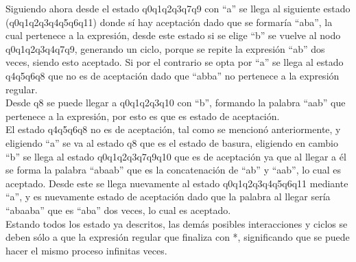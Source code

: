 \documentclass[11pt,letterpaper]{article}
\begin{document}
Siguiendo ahora desde el estado q0q1q2q3q7q9 con “a” se llega al siguiente estado (q0q1q2q3q4q5q6q11) donde sí hay aceptación dado que se formaría “aba”, la cual pertenece a la expresión, desde este estado si se elige “b” se vuelve al nodo q0q1q2q3q4q7q9, generando un ciclo, porque se repite la expresión “ab” dos veces, siendo esto aceptado. Si por el contrario se opta por “a” se llega al estado q4q5q6q8 que no es de aceptación dado que “abba” no pertenece a la expresión regular. \\

Desde q8 se puede llegar a q0q1q2q3q10 con “b”, formando la palabra “aab” que pertenece a la expresión, por esto es que es estado de aceptación. \\

El estado q4q5q6q8 no es de aceptación, tal como se mencionó anteriormente, y eligiendo “a” se va al estado q8 que es el estado de basura,  eligiendo en cambio “b” se llega al estado q0q1q2q3q7q9q10 que es de aceptación ya que al llegar a él se forma la palabra “abaab” que es la concatenación de “ab” y “aab”, lo cual es aceptado. Desde este se llega nuevamente al estado q0q1q2q3q4q5q6q11 mediante “a”, y es nuevamente estado de aceptación dado que la palabra al llegar sería “abaaba” que es “aba” dos veces, lo cual es aceptado. \\

Estando todos los estado ya descritos, las demás posibles  interacciones y ciclos se deben sólo a que la expresión regular que finaliza con *, significando que se puede hacer el mismo proceso infinitas veces.
\end{document}
